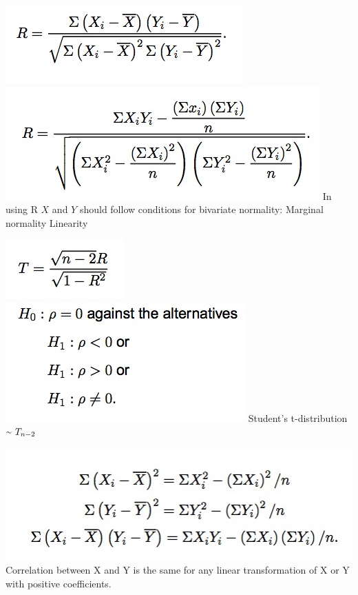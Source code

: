 \documentclass{examnotes}
\begin{document}

\includegraphics[scale=0.5]{./img/r1.jpg}\includegraphics[scale=0.5]{./img/r2.jpg}
In using R $X$ and $Y$ should follow conditions for bivariate normality:
 Marginal normality
 Linearity

\includegraphics[scale=0.5]{./img/tcor.jpg} \includegraphics[scale=0.5]{./img/thyp.jpg}
Student's t-distribution $\mytilde\ T_{n-2}$

\includegraphics[scale=0.5]{./img/altcov.jpg}
Correlation between X and Y is the same for any linear transformation of X or Y with positive coefficients.
\end{document}
